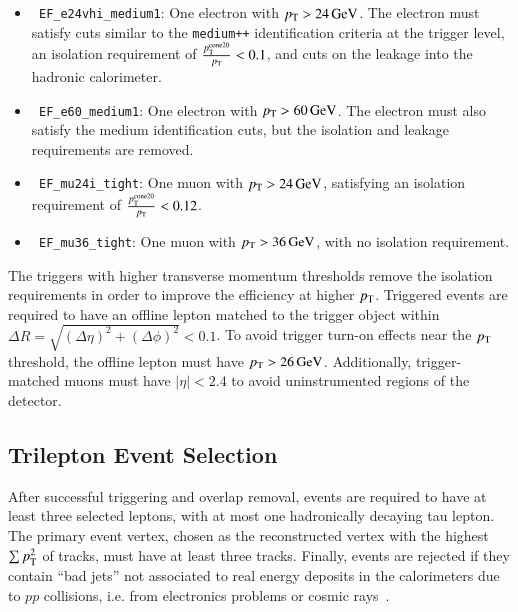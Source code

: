 \begin{itemize}
	\item \texttt{ EF\_e24vhi\_medium1}: One electron with $p_{\text{T}}>\SI{24}{\giga\electronvolt}$. The electron must satisfy cuts similar to the \texttt{medium++} identification criteria at the trigger level, an isolation requirement of $\frac{p_{\text{T}}^{\mathrm{cone}20}}{p_{\text{T}}}<0.1$, and cuts on the leakage into the hadronic calorimeter.
	\item \texttt{ EF\_e60\_medium1}: One electron with $p_{\text{T}}>\SI{60}{\giga\electronvolt}$. The electron must also satisfy the medium identification cuts, but the isolation and leakage requirements are removed.
	\item \texttt{ EF\_mu24i\_tight}: One muon with $p_{\text{T}}>\SI{24}{\giga\electronvolt}$, satisfying an isolation requirement of $\frac{p_{\text{T}}^{\mathrm{cone}20}}{p_{\text{T}}}<0.12$.
	\item \texttt{ EF\_mu36\_tight}: One muon with $p_{\text{T}}>\SI{36}{\giga\electronvolt}$, with no isolation requirement.
\end{itemize}

The triggers with higher transverse momentum thresholds remove the isolation requirements in order to improve the efficiency at higher $p_{\text{T}}$. Triggered events are required to have an offline lepton matched to the trigger object within $\Delta R=\sqrt{(\Delta\eta)^2+(\Delta\phi)^2} < 0.1$. To avoid trigger turn-on effects near the $p_{\text{T}}$ threshold, the offline lepton must have $p_{\text{T}}>\SI{26}{\giga\electronvolt}$. Additionally, trigger-matched muons must have $|\eta|<2.4$ to avoid uninstrumented regions of the detector.


\subsection{Trilepton Event Selection}\label{sec:model-independent-trilepton-event-selection}
After successful triggering and overlap removal, events are required to have at least three selected leptons, with at most one hadronically decaying tau lepton. The primary event vertex, chosen as the reconstructed vertex with the highest $\sum p_{\text{T}}^2$ of tracks, must have at least three tracks. Finally, events are rejected if they contain ``bad jets'' not associated to real energy deposits in the calorimeters due to $pp$ collisions, i.e. from electronics problems or cosmic rays~\cite{TheATLASCollaboration:2015ds}.


